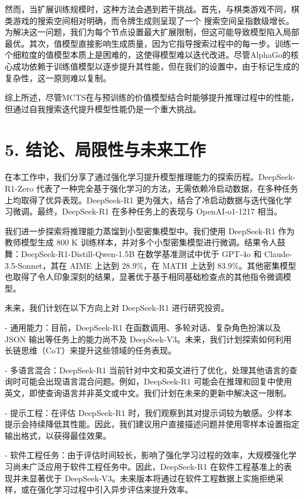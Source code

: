 \documentclass[12pt,a4paper]{report} %
\begin{document}
然而，当扩展训练规模时，这种方法会遇到若干挑战。首先，与棋类游戏不同，棋类游戏的搜索空间相对明确，而令牌生成则呈现了一个
搜索空间呈指数级增长。为解决这一问题，我们为每个节点设置最大扩展限制，但这可能导致模型陷入局部最优。其次，值模型直接影响生成质量，因为它指导搜索过程中的每一步。训练一个细粒度的值模型本质上是困难的，这使得模型难以迭代改进。尽管AlphaGo的核心成功依赖于训练值模型以逐步提升其性能，但在我们的设置中，由于标记生成的复杂性，这一原则难以复制。


综上所述，尽管MCTS在与预训练的价值模型结合时能够提升推理过程中的性能，但通过自我搜索迭代提升模型性能仍是一个重大挑战。


\section*{5. 结论、局限性与未来工作}


在本工作中，我们分享了通过强化学习提升模型推理能力的探索历程。DeepSeek-R1-Zero 代表了一种完全基于强化学习的方法，无需依赖冷启动数据，在多种任务上均取得了优异表现。DeepSeek-R1 更为强大，结合了冷启动数据与迭代强化学习微调。最终，DeepSeek-R1 在多种任务上的表现与 OpenAI-o1-1217 相当。


我们进一步探索将推理能力蒸馏到小型密集模型中。我们使用 DeepSeek-R1 作为教师模型生成 800 K 训练样本，并对多个小型密集模型进行微调。结果令人鼓舞：DeepSeek-R1-Distill-Qwen-1.5B 在数学基准测试中优于 GPT-4o 和 Claude-3.5-Sonnet，其在 AIME 上达到 $28.9 \%$，在 MATH 上达到 $83.9 \%$。其他密集模型也取得了令人印象深刻的结果，显著优于基于相同基础检查点的其他指令微调模型。


未来，我们计划在以下方向上对 DeepSeek-R1 进行研究投资。


- 通用能力：目前，DeepSeek-R1 在函数调用、多轮对话、复杂角色扮演以及 JSON 输出等任务上的能力尚不及 DeepSeek-V3。未来，我们计划探索如何利用长链思维（CoT）来提升这些领域的任务表现。


- 多语言混合：DeepSeek-R1 当前针对中文和英文进行了优化，处理其他语言的查询时可能会出现语言混合问题。例如，DeepSeek-R1 可能会在推理和回复中使用英文，即使查询语言并非英文或中文。我们计划在未来的更新中解决这一限制。


- 提示工程：在评估 DeepSeek-R1 时，我们观察到其对提示词较为敏感。少样本提示会持续降低其性能。因此，我们建议用户直接描述问题并使用零样本设置指定输出格式，以获得最佳效果。


- 软件工程任务：由于评估时间较长，影响了强化学习过程的效率，大规模强化学习尚未广泛应用于软件工程任务中。因此，DeepSeek-R1 在软件工程基准上的表现并未显著优于 DeepSeek-V3。未来版本将通过在软件工程数据上实施拒绝采样，或在强化学习过程中引入异步评估来提升效率。

\end{document}
